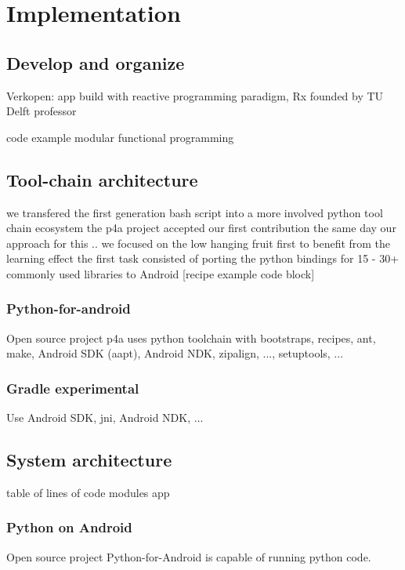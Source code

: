 \chapter{Implementation}

\section{Develop and organize} %


Verkopen: app build with reactive programming paradigm, Rx founded by TU Delft professor

code example
modular functional programming



\section{Tool-chain architecture}


we transfered the first generation bash script into a more involved python tool chain ecosystem
the p4a project accepted our first contribution the same day
our approach for this .. we focused on the low hanging fruit first to benefit from the learning effect
the first task consisted of porting the python bindings for 15 - 30+ commonly used libraries to Android [recipe example code block]

\subsection{Python-for-android}
Open source project p4a uses python toolchain with bootstraps, recipes, ant, make, Android SDK (aapt), Android NDK, zipalign, ..., setuptools, ...

\subsection{Gradle experimental}
Use Android SDK, jni, Android NDK, ...


\section{System architecture}
table of lines of code
modules app

\subsection{Python on Android}
Open source project Python-for-Android is capable of running python code.

